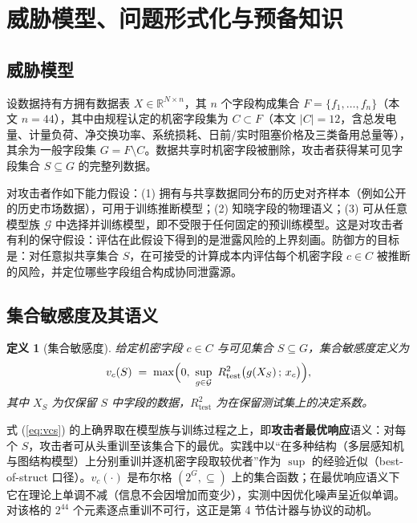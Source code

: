 \documentclass[10.5pt,compsoc,UTF8]{CjC}
\theoremstyle{mystyle}
\newtheorem{definition}{定义}
\begin{document}
\section{\heiti 威胁模型、问题形式化与预备知识}

\subsection{威胁模型}

设数据持有方拥有数据表 $X\in\mathbb{R}^{N\times n}$，其 $n$ 个字段构成集合 $F=\{f_1,\dots,f_n\}$（本文 $n=44$），其中由规程认定的机密字段集为 $C\subset F$（本文 $|C|=12$，含总发电量、计量负荷、净交换功率、系统损耗、日前/实时阻塞价格及三类备用总量等），其余为一般字段集 $G=F\setminus C$。数据共享时机密字段被删除，攻击者获得某可见字段集合 $S\subseteq G$ 的完整列数据。

对攻击者作如下能力假设：(1) 拥有与共享数据同分布的历史对齐样本（例如公开的历史市场数据），可用于训练推断模型；(2) 知晓字段的物理语义；(3) 可从任意模型族 $\mathcal{G}$ 中选择并训练模型，即不受限于任何固定的预训练模型。这是对攻击者有利的保守假设：评估在此假设下得到的是泄露风险的上界刻画。防御方的目标是：对任意拟共享集合 $S$，在可接受的计算成本内评估每个机密字段 $c\in C$ 被推断的风险，并定位哪些字段组合构成协同泄露源。

\subsection{集合敏感度及其语义}

\begin{definition}[集合敏感度]
给定机密字段 $c\in C$ 与可见集合 $S\subseteq G$，集合敏感度定义为
\begin{equation}
v_c(S)\;=\;\max\Bigl(0,\ \sup_{g\in\mathcal{G}}\ R^2_{\mathrm{test}}\bigl(g(X_S)\,;\,x_c\bigr)\Bigr),
\label{eq:vcs}
\end{equation}
其中 $X_S$ 为仅保留 $S$ 中字段的数据，$R^2_{\mathrm{test}}$ 为在保留测试集上的决定系数。
\end{definition}

式 (\ref{eq:vcs}) 的上确界取在模型族与训练过程之上，即\textbf{攻击者最优响应}语义：对每个 $S$，攻击者可从头重训至该集合下的最优。实践中以“在多种结构（多层感知机与图结构模型）上分别重训并逐机密字段取较优者”作为 $\sup$ 的经验近似（best-of-struct 口径）。$v_c(\cdot)$ 是布尔格 $(2^{G},\subseteq)$ 上的集合函数；在最优响应语义下它在理论上单调不减（信息不会因增加而变少），实测中因优化噪声呈近似单调。对该格的 $2^{44}$ 个元素逐点重训不可行，这正是第 4 节估计器与协议的动机。
\end{document}
